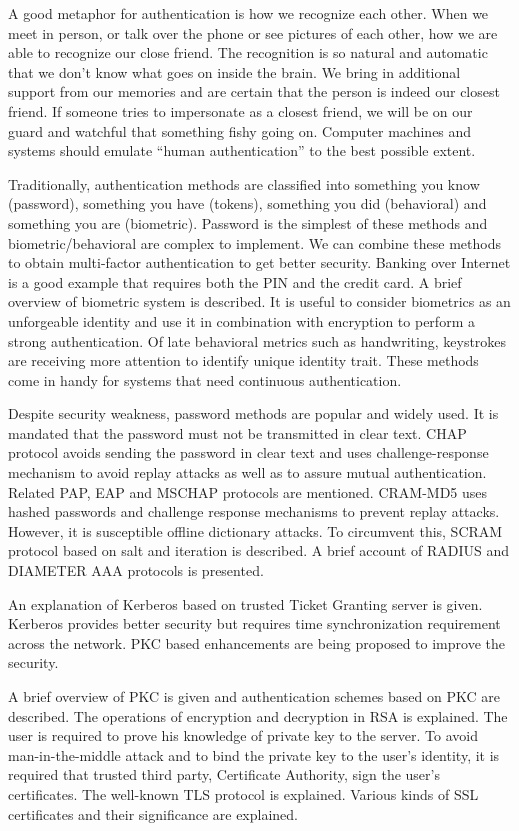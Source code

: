 \begin{multicols}{2}
A good metaphor for authentication is how we recognize each other. When we meet in person, or talk over the phone or see pictures of each other, how we are able to recognize our close friend. The recognition is so natural and automatic that we don't know what goes on inside the brain. We bring in additional support from our memories and are certain that the person is indeed our closest friend. If someone tries to impersonate as a closest friend, we will be on our guard and watchful that something fishy going on. Computer machines and systems should emulate ``human authentication'' to the best possible extent.

Traditionally, authentication methods are classified into something you know (password), something you have (tokens), something you did (behavioral) and something you are (biometric). Password is the simplest of these methods and biometric/behavioral are complex to implement. We can combine these methods to obtain multi-factor authentication to get better security. Banking over Internet is a good example that requires both the PIN and the credit card. A brief overview of biometric system is described. It is useful to consider biometrics as an unforgeable identity and use it in combination with encryption to perform a strong authentication. Of late behavioral metrics such as handwriting, keystrokes are receiving more attention to identify unique identity trait. These methods come in handy for systems that need continuous authentication.

Despite security weakness, password methods are popular and widely used. It is mandated that the password must not be transmitted in clear text. CHAP protocol avoids sending the password in clear text and uses challenge-response mechanism to avoid replay attacks as well as to assure mutual authentication. Related PAP, EAP and MSCHAP protocols are mentioned. CRAM-MD5 uses hashed passwords and challenge response mechanisms to prevent replay attacks. However, it is susceptible offline dictionary attacks. To circumvent this, SCRAM protocol based on salt and iteration is described. A brief account of RADIUS and DIAMETER AAA protocols is presented.

An explanation of Kerberos based on trusted Ticket Granting server is given. Kerberos provides better security but requires time synchronization requirement across the network. PKC based enhancements are being proposed to improve the security.

A brief overview of PKC is given and authentication schemes based on PKC are described. The operations of encryption and decryption in RSA is explained. The user is required to prove his knowledge of private key to the server. To avoid man-in-the-middle attack and to bind the private key to the user's identity, it is required that trusted third party, Certificate Authority, sign the user's certificates. The well-known TLS protocol is explained. Various kinds of SSL certificates and their significance are explained.


\end{multicols}
